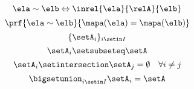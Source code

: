 \begin{forslides}
    \begin{equation}\label{eq:slides_session2_rel_158}
        \ela\sim \elb \Leftrightarrow \inrel{\ela}{\relA}{\elb}
    \end{equation}
    \begin{equation}\label{eq:slides_session2_rel_159}
        \prf{
            \ela\sim \elb
        }{
            \mapa(\ela)=\mapa(\elb)
        }
    \end{equation}
    \begin{equation}\label{eq:slides_session2_rel_160}
        \{\setA_i\}_{i\setin I}
    \end{equation}
    \begin{equation}\label{eq:slides_session2_rel_161}
        \setA_i\setsubseteq \setA
    \end{equation}
    \begin{equation}\label{eq:slides_session2_rel_162}
        \setA_i\setintersection \setA_j=\emptyset \quad \forall i\neq j
    \end{equation}
    \begin{equation}\label{eq:slides_session2_rel_163}
        \bigsetunion_{i\setin I}\setA_i=\setA
    \end{equation}


\end{forslides}

